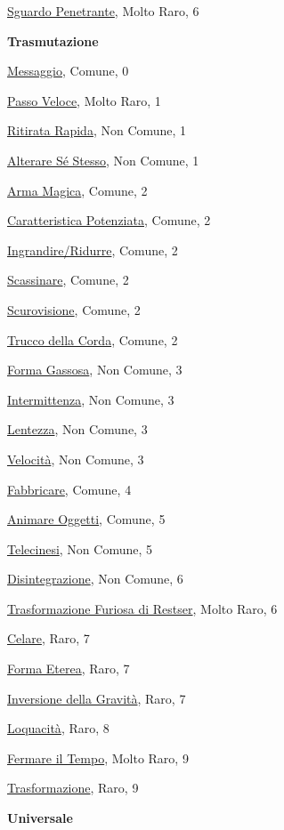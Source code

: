 \begin{multicols}{3}
{{\hyperlink{Sguardo Penetrante}{Sguardo Penetrante}, Molto Raro, 6

\medskip\textbf{Trasmutazione}

\hyperlink{Messaggio}{Messaggio}, Comune, 0

\hyperlink{Passo Veloce}{Passo Veloce}, Molto Raro, 1

\hyperlink{Ritirata Rapida}{Ritirata Rapida}, Non Comune, 1

\hyperlink{Alterare Sé Stesso}{Alterare Sé Stesso}, Non Comune, 1

\hyperlink{Arma Magica}{Arma Magica}, Comune, 2

\hyperlink{Caratteristica Potenziata}{Caratteristica Potenziata}, Comune, 2

\hyperlink{Ingrandire/Ridurre}{Ingrandire/Ridurre}, Comune, 2

\hyperlink{Scassinare}{Scassinare}, Comune, 2

\hyperlink{Scurovisione}{Scurovisione}, Comune, 2

\hyperlink{Trucco della Corda}{Trucco della Corda}, Comune, 2

\hyperlink{Forma Gassosa}{Forma Gassosa}, Non Comune, 3

\hyperlink{Intermittenza}{Intermittenza}, Non Comune, 3

\hyperlink{lentezza}{Lentezza}, Non Comune, 3

\hyperlink{Velocità}{Velocità}, Non Comune, 3

\hyperlink{Fabbricare}{Fabbricare}, Comune, 4

\hyperlink{Animare Oggetti}{Animare Oggetti}, Comune, 5

\hyperlink{Telecinesi}{Telecinesi}, Non Comune, 5

\hyperlink{Disintegrazione}{Disintegrazione}, Non Comune, 6

\hyperlink{Trasformazione Furiosa di Restser}{Trasformazione Furiosa di Restser}, Molto Raro, 6

\hyperlink{Celare}{Celare}, Raro, 7

\hyperlink{Forma Eterea}{Forma Eterea}, Raro, 7

\hyperlink{Inversione della Gravità}{Inversione della Gravità}, Raro, 7

\hyperlink{Loquacità}{Loquacità}, Raro, 8

\hyperlink{Fermare il Tempo}{Fermare il Tempo}, Molto Raro, 9

\hyperlink{Trasformazione}{Trasformazione}, Raro, 9

\medskip\textbf{Universale}

}}
\end{multicols}
